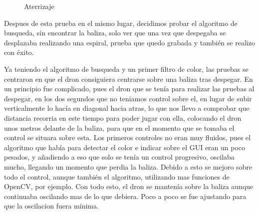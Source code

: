 \begin{figure}[ht]
 \centering
 \caption{Aterrizaje}
 \label{f:Test 1}
\end{figure}

\hspace{1 cm} Despues de esta prueba en el mismo lugar, decidimos probar el algoritmo de busqueda, sin encontrar la baliza, solo ver que una vez que despegaba se desplazaba realizando una espiral, prueba que quedo grabada y tambi\'en se realizo con \'exito.

\hspace{1 cm} Ya teniendo el algoritmo de busqueda y un primer filtro de color, las pruebas se centraron en que el dron consiguiera centrarse sobre una baliza tras despegar. En un principio fue complicado, pues el dron que se ten\'ia para realizar las pruebas al despegar, en los dos segundos que no teniamos control sobre el, en lugar de subir verticalmente lo hac\'ia en diagonal hacia atras, lo que nos llevo a comprobar que distancia recorria en este tiempo para poder jugar con ella, colocando el dron unos metros delante de la baliza, para que en el momento que se tomaba el control se situara sobre esta. Los primeros controles no eran muy fluidos, pues el algoritmo que hab\'ia para detectar el color e indicar sobre el GUI eran un poco pesados, y añadiendo a eso que solo se ten\'ia un control progresivo, oscilaba mucho,  llegando un momento que perdia la baliza. Debido a esto se mejoro sobre todo el control, aunque tambi\'en el algoritmo, utilizando mas funciones de OpenCV, por ejemplo. Con todo esto, el dron se manten\'ia sobre la baliza aunque continuaba oscilando mas de lo que debiera. Poco a poco se fue ajustando para que la oscilacion fuera m\'inima.

